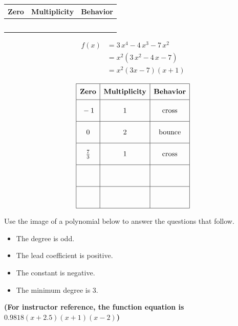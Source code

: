 \documentclass[addpoints]{exam}
\begin{document}
\begin{questions}
\renewcommand{\arraystretch}{3}
\begin{tabular}{|p{20mm}|p{25mm}|p{20mm}|}\hline
\textbf{Zero} & \textbf{Multiplicity} & \textbf{Behavior}\\ \hline
 & & \\ \hline
 & & \\ \hline
 & & \\ \hline
 & & \\ \hline
 & & \\ \hline
\end{tabular}

\begin{solution}
\[\begin{aligned} f(x) &= 3 \, x^{4} - 4 \, x^{3} - 7 \, x^{2} \\ &= x^2(3 \, x^{2} - 4 \, x - 7) \\ &= x^2(3x - 7)(x + 1) \end{aligned}\]

 \[\begin{array}{|c|c|c|} \hline \rule[-0.8em]{0pt}{2.2em} \textbf{Zero} & \textbf{Multiplicity} & \textbf{Behavior} \\ \hline \rule[-1.2em]{0pt}{3em} -1 & 1 & \text{cross} \\ \hline \rule[-1.2em]{0pt}{3em} 0 & 2 & \text{bounce} \\ \hline \rule[-1.2em]{0pt}{3em} \frac{7}{3} & 1 & \text{cross} \\ \hline \rule[-1.2em]{0pt}{3em} & & \\ \hline \rule[-1.2em]{0pt}{3em} & & \\ \hline \end{array}\]
\end{solution}
\newpage

\question Use the image of a polynomial below to answer the questions that follow.\\
\begin{solution}
\begin{itemize}
\item
The degree is odd.

\item
The lead coefficient is positive.

\item
The constant is negative.

\item
The minimum degree is 3.

\end{itemize}
 \textbf{(For instructor reference, the function equation is \(0.9818(x + 2.5)(x + 1)(x - 2)\))}
\end{solution}


\end{questions}
\end{document}
